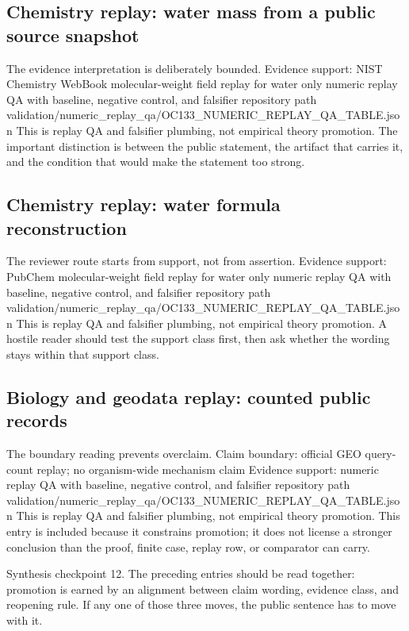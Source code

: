 \subsection{Chemistry replay: water mass from a public source snapshot}
The evidence interpretation is deliberately bounded. Evidence support: NIST Chemistry WebBook molecular-weight field replay for water only numeric replay QA with baseline, negative control, and falsifier repository path validation/numeric\_replay\_qa/OC133\_NUMERIC\_REPLAY\_QA\_TABLE.json This is replay QA and falsifier plumbing, not empirical theory promotion. The important distinction is between the public statement, the artifact that carries it, and the condition that would make the statement too strong.

\subsection{Chemistry replay: water formula reconstruction}
The reviewer route starts from support, not from assertion. Evidence support: PubChem molecular-weight field replay for water only numeric replay QA with baseline, negative control, and falsifier repository path validation/numeric\_replay\_qa/OC133\_NUMERIC\_REPLAY\_QA\_TABLE.json This is replay QA and falsifier plumbing, not empirical theory promotion. A hostile reader should test the support class first, then ask whether the wording stays within that support class.

\subsection{Biology and geodata replay: counted public records}
The boundary reading prevents overclaim. Claim boundary: official GEO query-count replay; no organism-wide mechanism claim Evidence support: numeric replay QA with baseline, negative control, and falsifier repository path validation/numeric\_replay\_qa/OC133\_NUMERIC\_REPLAY\_QA\_TABLE.json This is replay QA and falsifier plumbing, not empirical theory promotion. This entry is included because it constrains promotion; it does not license a stronger conclusion than the proof, finite case, replay row, or comparator can carry.

Synthesis checkpoint 12. The preceding entries should be read together: promotion is earned by an alignment between claim wording, evidence class, and reopening rule. If any one of those three moves, the public sentence has to move with it.

